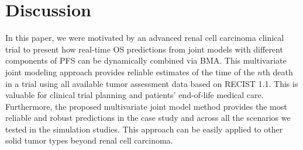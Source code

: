 \section{Discussion}
\label{sec:discussion}
In this paper, we were motivated by an advanced renal cell carcinoma clinical trial to present how real-time \ac{OS} predictions from joint models with different components of \ac{PFS} can be dynamically combined via BMA. This multivariate joint modeling approach provides reliable estimates of the time of the $n$th death in a trial using all available tumor assessment data based on \ac{RECIST} 1.1. This is valuable for clinical trial planning and patients' end-of-life medical care. Furthermore, the proposed multivariate joint model method provides the most reliable and robust predictions in the case study and across all the scenarios we tested in the simulation studies. This approach can be easily applied to other solid tumor types beyond renal cell carcinoma.

